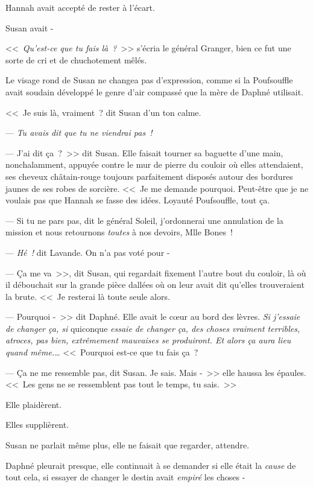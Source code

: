 Hannah avait accepté de rester à l'écart.

Susan avait -

\later

<<~\emph{Qu'est-ce que tu fais là~?}~>> s'écria le général Granger, bien ce fut une sorte de cri et de chuchotement mêlés.

Le visage rond de Susan ne changea pas d'expression, comme si la Poufsouffle avait soudain développé le genre d'air compassé que la mère de Daphné utilisait.

<<~Je suis là, vraiment~? dit Susan d'un ton calme.

--- \emph{Tu avais dit que tu ne viendrai pas~!}

--- J'ai dit ça~?~>> dit Susan. Elle faisait tourner sa baguette d'une main, nonchalamment, appuyée contre le mur de pierre du couloir où elles attendaient, ses cheveux châtain-rouge toujours parfaitement disposés autour des bordures jaunes de ses robes de sorcière. <<~Je me demande pourquoi. Peut-être que je ne voulais pas que Hannah se fasse des idées. Loyauté Poufsouffle, tout ça.

--- Si tu ne pars pas, dit le général Soleil, j'ordonnerai une annulation de la mission et nous retournons \emph{toutes} à nos devoirs, Mlle Bones~!

--- \emph{Hé~!} dit Lavande. On n'a pas voté pour -

--- Ça me va~>>, dit Susan, qui regardait fixement l'autre bout du couloir, là où il débouchait sur la grande pièce dallées où on leur avait dit qu'elles trouveraient la brute. <<~Je resterai là toute seule alors.

--- Pourquoi -~>> dit Daphné. Elle avait le cœur au bord des lèvres. \emph{Si j'essaie de changer ça, si} quiconque \emph{essaie de changer ça, des choses vraiment terribles, atroces, pas bien, extrêmement mauvaises se produiront. Et alors ça aura lieu quand même.}… <<~Pourquoi est-ce que tu fais ça~?

--- Ça ne me ressemble pas, dit Susan. Je sais. Mais -~>> elle haussa les épaules. <<~Les gens ne se ressemblent pas tout le temps, tu sais.~>>

Elle plaidèrent.

Elles supplièrent.

Susan ne parlait même plus, elle ne faisait que regarder, attendre.

Daphné pleurait presque, elle continuait à se demander si elle était la \emph{cause} de tout cela, si essayer de changer le destin avait \emph{empiré} les choses -

